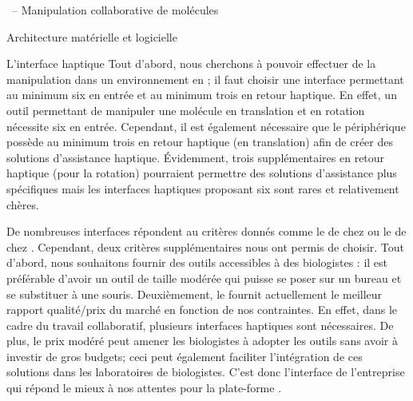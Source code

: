 \documentclass[myfrancais]{mythesis}
\begin{document}
\begin{mychapter}{\myShaddock\ -- Manipulation collaborative de molécules}
\begin{mysection}{Architecture matérielle et logicielle}
\begin{mysubsection}{L'interface haptique}
				Tout d'abord, nous cherchons à pouvoir effectuer de la manipulation dans un environnement en \myThreeD; il faut choisir une interface permettant au minimum six  en entrée et au minimum trois  en retour haptique.
				En effet, un outil permettant de manipuler une molécule en translation et en rotation nécessite six  en entrée.
				Cependant, il est également nécessaire que le périphérique possède au minimum trois  en retour haptique (en translation) afin de créer des solutions d'assistance haptique.
				Évidemment, trois  supplémentaires en retour haptique (pour la rotation) pourraient permettre des solutions d'assistance plus spécifiques mais les interfaces haptiques proposant six  sont rares et relativement chères.

				De nombreuses interfaces répondent au critères donnés comme le \myPremium de chez \mySensAble ou le \myVirtuose de chez \myHaption.
				Cependant, deux critères supplémentaires nous ont permis de choisir.
				Tout d'abord, nous souhaitons fournir des outils accessibles à des biologistes : il est préférable d'avoir un outil de taille modérée qui puisse se poser sur un bureau et se substituer à une souris.
				Deuxièmement, le \myOmni fournit actuellement le meilleur rapport qualité/prix du marché en fonction de nos contraintes.
				En effet, dans le cadre du travail collaboratif, plusieurs interfaces haptiques sont nécessaires.
				De plus, le prix modéré peut amener les biologistes à adopter les outils sans avoir à investir de gros budgets; ceci peut également faciliter l'intégration de ces solutions dans les laboratoires de biologistes.
				C'est donc l'interface \myOmni {} de l'entreprise \mySensAble qui répond le mieux à nos attentes pour la plate-forme \myShaddock {}.

				\begin{myfigure}
				\end{myfigure}


\end{mysubsection}
\end{mysection}
\end{mychapter}
\end{document}
